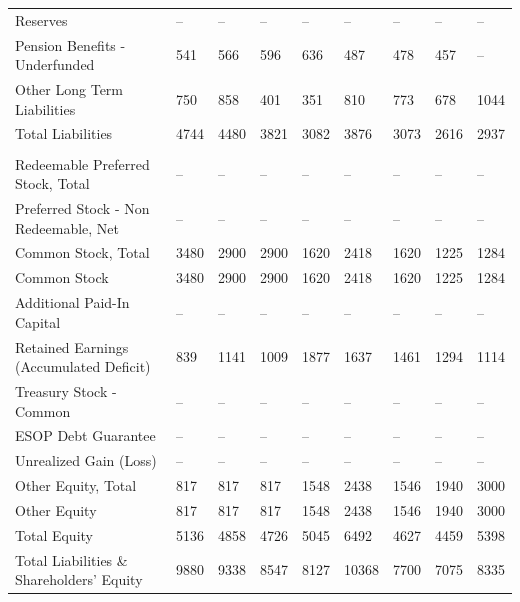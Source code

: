 \documentclass[grad,numbers]{coppe}
\begin{document}
\begin{longtable}[t]{lllllllll}
  \hspace{1em}\hspace{1em}Reserves & -- & -- & -- & -- & -- & -- & -- & --\\
  \hspace{1em}\hspace{1em}Pension Benefits - Underfunded & 541 & 566 & 596 & 636 & 487 & 478 & 457 & --\\
  \hspace{1em}\hspace{1em}Other Long Term Liabilities & 750 & 858 & 401 & 351 & 810 & 773 & 678 & 1044\\
  \hspace{1em}Total Liabilities & 4744 & 4480 & 3821 & 3082 & 3876 & 3073 & 2616 & 2937\\
  \addlinespace[0.3em]
  \multicolumn{9}{l}{\textbf{Shareholders' Equity}}\\
  \hspace{1em}Redeemable Preferred Stock, Total & -- & -- & -- & -- & -- & -- & -- & --\\
  \hspace{1em}Preferred Stock - Non Redeemable, Net & -- & -- & -- & -- & -- & -- & -- & --\\
  \hspace{1em}Common Stock, Total & 3480 & 2900 & 2900 & 1620 & 2418 & 1620 & 1225 & 1284\\
  \hspace{1em}\hspace{1em}Common Stock & 3480 & 2900 & 2900 & 1620 & 2418 & 1620 & 1225 & 1284\\
  \hspace{1em}Additional Paid-In Capital & -- & -- & -- & -- & -- & -- & -- & --\\
  \hspace{1em}Retained Earnings (Accumulated Deficit) & 839 & 1141 & 1009 & 1877 & 1637 & 1461 & 1294 & 1114\\
  \hspace{1em}Treasury Stock - Common & -- & -- & -- & -- & -- & -- & -- & --\\
  \hspace{1em}ESOP Debt Guarantee & -- & -- & -- & -- & -- & -- & -- & --\\
  \hspace{1em}Unrealized Gain (Loss) & -- & -- & -- & -- & -- & -- & -- & --\\
  \hspace{1em}Other Equity, Total & 817 & 817 & 817 & 1548 & 2438 & 1546 & 1940 & 3000\\
  \hspace{1em}\hspace{1em}Other Equity & 817 & 817 & 817 & 1548 & 2438 & 1546 & 1940 & 3000\\
  \hspace{1em}Total Equity & 5136 & 4858 & 4726 & 5045 & 6492 & 4627 & 4459 & 5398\\
  \hspace{1em}Total Liabilities \& Shareholders' Equity & 9880 & 9338 & 8547 & 8127 & 10368 & 7700 & 7075 & 8335\\*
  \end{longtable}
  \endgroup{}
\end{document}
